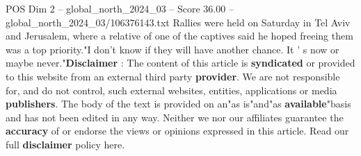 \begin{textsample}{POS Dim 2 – global\_north\_2024\_03 – Score 36.00 – global\_north\_2024\_03/106376143.txt}
Rallies were held on Saturday in Tel Aviv and Jerusalem, where a relative of one of the captives said he hoped freeing them was a top priority."I don't know if they will have another chance.
It ' s now or maybe never."\textbf{Disclaimer} : The content of this article is \textbf{syndicated} or provided to this website from an external third party \textbf{provider}.
We are not responsible for, and do not control, such external websites, entities, applications or media \textbf{publishers}.
The body of the text is provided on an"as is"and"as \textbf{available}"basis and has not been edited in any way.
Neither we nor our affiliates guarantee the \textbf{accuracy} of or endorse the views or opinions expressed in this article.
Read our full \textbf{disclaimer} policy here.

\end{textsample}
